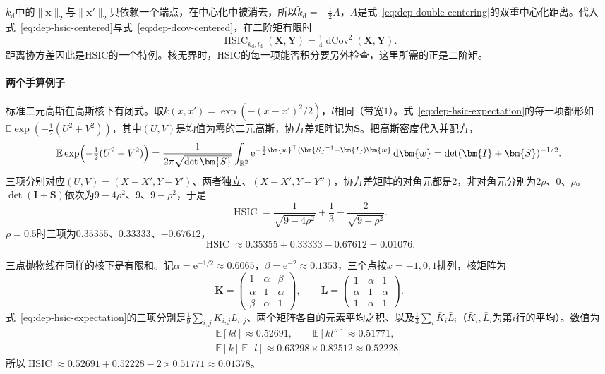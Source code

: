 $k_{\mathrm{d}}$中的$\lVert\bm{x}\rVert_2$与$\lVert\bm{x}'\rVert_2$只依赖一个端点，在中心化中被消去，所以$\tilde{k}_{\mathrm{d}}=-\frac12A$，$A$是式~\eqref{eq:dep-double-centering}的双重中心化距离。代入式~\eqref{eq:dep-hsic-centered}与式~\eqref{eq:dep-dcov-centered}，在二阶矩有限时
\[
  \operatorname{HSIC}_{k_{\mathrm{d}},l_{\mathrm{d}}}(\bm{X},\bm{Y})=\tfrac14\operatorname{dCov}^{2}(\bm{X},\bm{Y}).
\]
距离协方差因此是HSIC的一个特例。核无界时，HSIC的每一项能否积分要另外检查，这里所需的正是二阶矩。

\paragraph{两个手算例子}
标准二元高斯在高斯核下有闭式。取$k(x,x')=\exp(-(x-x')^{2}/2)$，$l$相同（带宽$1$）。式~\eqref{eq:dep-hsic-expectation}的每一项都形如$\mathbb{E}\exp(-\frac12(U^{2}+V^{2}))$，其中$(U,V)$是均值为零的二元高斯，协方差矩阵记为$\bm{S}$。把高斯密度代入并配方，
\[
  \mathbb{E}\exp\Bigl(-\tfrac12(U^{2}+V^{2})\Bigr)=\frac{1}{2\pi\sqrt{\det\bm{S}}}\int_{\mathbb{R}^{2}}\mathrm{e}^{-\frac12\bm{w}^{\top}(\bm{S}^{-1}+\bm{I})\bm{w}}\,\mathrm{d}\bm{w}=\det(\bm{I}+\bm{S})^{-1/2}.
\]
三项分别对应$(U,V)=(X-X',Y-Y')$、两者独立、$(X-X',Y-Y'')$，协方差矩阵的对角元都是$2$，非对角元分别为$2\rho$、$0$、$\rho$。$\det(\bm{I}+\bm{S})$依次为$9-4\rho^{2}$、$9$、$9-\rho^{2}$，于是
\begin{equation}
  \operatorname{HSIC}=\frac{1}{\sqrt{9-4\rho^{2}}}+\frac13-\frac{2}{\sqrt{9-\rho^{2}}}.
  \label{eq:dep-hsic-gauss}
\end{equation}
$\rho=0.5$时三项为$0.35355$、$0.33333$、$-0.67612$，
\[
  \operatorname{HSIC}\approx0.35355+0.33333-0.67612=0.01076 .
\]

三点抛物线在同样的核下是有限和。记$\alpha=\mathrm{e}^{-1/2}\approx0.6065$，$\beta=\mathrm{e}^{-2}\approx0.1353$，三个点按$x=-1,0,1$排列，核矩阵为
\[
  \bm{K}=\begin{pmatrix}1&\alpha&\beta\\ \alpha&1&\alpha\\ \beta&\alpha&1\end{pmatrix},\qquad
  \bm{L}=\begin{pmatrix}1&\alpha&1\\ \alpha&1&\alpha\\ 1&\alpha&1\end{pmatrix}.
\]
式~\eqref{eq:dep-hsic-expectation}的三项分别是$\frac19\sum_{i,j}K_{i,j}L_{i,j}$、两个矩阵各自的元素平均之积、以及$\frac13\sum_i\bar{K}_i\bar{L}_i$（$\bar{K}_i,\bar{L}_i$为第$i$行的平均）。数值为
\[
  \begin{gathered}
  \mathbb{E}[kl]\approx0.52691,\qquad \mathbb{E}[kl'']\approx0.51771,\\
  \mathbb{E}[k]\,\mathbb{E}[l]\approx0.63298\times0.82512\approx0.52228,
  \end{gathered}
\]
所以$\operatorname{HSIC}\approx0.52691+0.52228-2\times0.51771\approx0.01378$。

